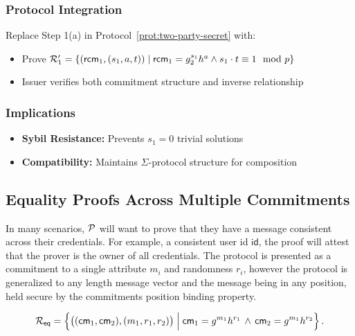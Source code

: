\subsubsection{Protocol Integration}
Replace Step 1(a) in Protocol~\ref{prot:two-party-secret} with:
\begin{itemize}
    \item Prove \(\mathcal{R}_1' = \{(\mathsf{rcm}_1, (s_1, a, t)) \mid \mathsf{rcm}_1 = g_2^{s_1}h^a \land s_1 \cdot t \equiv 1 \mod p\}\)
    \item Issuer verifies both commitment structure and inverse relationship
\end{itemize}

\subsubsection{Implications}
\begin{itemize}
    \item \textbf{Sybil Resistance:} Prevents \(s_1 = 0\) trivial solutions
    \item \textbf{Compatibility:} Maintains \(\Sigma\)-protocol structure for composition
\end{itemize}






\subsection{Equality Proofs Across Multiple Commitments}\label{pok-eq}
In many scenarios, $\mathcal{P}$ will want to prove that they have a message consistent across their credentials. For example, a consistent user id $\textsf{id}$, the proof will attest that the prover is the owner of all credentials. The protocol is presented as a commitment to a single attribute $m_i$ and randomness $r_i$, however the protocol is generalized to any length message vector and the message being in any position, held secure by the commitments position binding property.

\[
\mathcal{R}_{\mathsf{eq}} = \left\{ 
    \big((\mathsf{cm}_1, \mathsf{cm}_2), (m_1, r_1, r_2)\big) \; 
    \Big| \; 
    \mathsf{cm}_1 = g^{m_1}h^{r_1} \, \land \, \mathsf{cm}_2 = g^{m_1}h^{r_2} 
\right\}.
\]


